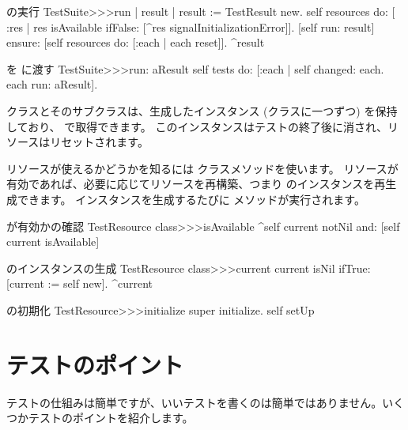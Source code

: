 \documentclass[a4paper,10pt,twoside]{book}
\begin{document}
\begin{method}[testsuiterun]{ の実行}
TestSuite>>>run
	| result |
 	result := TestResult new.
	self resources do: [ :res |
		res isAvailable ifFalse: [^res signalInitializationError]].
	[self run: result] ensure: [self resources do: [:each | each reset]].
	^result
\end{method}

\begin{method}[testsuiterun:]{ を  に渡す}
TestSuite>>>run: aResult
	self tests do: [:each | 
		self changed: each.
		each run: aResult].
\end{method}

 クラスとそのサブクラスは、生成したインスタンス (クラスに一つずつ) を保持しており、  で取得できます。
このインスタンスはテストの終了後に消され、リソースはリセットされます。

リソースが使えるかどうかを知るには  クラスメソッドを使います。
リソースが有効であれば、必要に応じてリソースを再構築、つまり  のインスタンスを再生成できます。
インスタンスを生成するたびに  メソッドが実行されます。

\begin{method}[testresourceisavailable]{ が有効かの確認}
TestResource class>>>isAvailable
	^self current notNil and: [self current isAvailable]
\end{method}

\begin{method}[testresourcecurrent]{ のインスタンスの生成}
TestResource class>>>current
	current isNil ifTrue: [current := self new].
	^current
\end{method}

\begin{method}[restresourceinitialize]{ の初期化}
TestResource>>>initialize
	super initialize.
	self setUp
\end{method}

\section{テストのポイント}

テストの仕組みは簡単ですが、いいテストを書くのは簡単ではありません。いくつかテストのポイントを紹介します。
\end{document}
